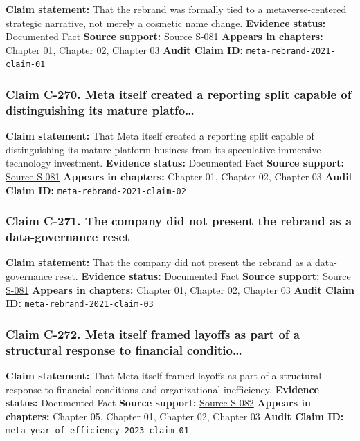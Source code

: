 \documentclass[
  american,
  11pt,
  letterpaper,
]{article}
\begin{document}
\textbf{Claim statement:} That the rebrand was formally tied to a
metaverse-centered strategic narrative, not merely a cosmetic name
change. \textbf{Evidence status:} Documented Fact \textbf{Source
support:}
\hyperref[source-s-081-the-facebook-company-is-now-meta]{Source S-081}
\textbf{Appears in chapters:} Chapter 01, Chapter 02, Chapter 03
\textbf{Audit Claim ID:} \texttt{meta-rebrand-2021-claim-01}

\subsubsection{Claim C-270. Meta itself created a reporting split
capable of distinguishing its mature
platfo\ldots{}}\label{claim-c-270-meta-itself-created-a-reporting-split-capable-of-distinguishing-its-mature-platfo}

\textbf{Claim statement:} That Meta itself created a reporting split
capable of distinguishing its mature platform business from its
speculative immersive-technology investment. \textbf{Evidence status:}
Documented Fact \textbf{Source support:}
\hyperref[source-s-081-the-facebook-company-is-now-meta]{Source S-081}
\textbf{Appears in chapters:} Chapter 01, Chapter 02, Chapter 03
\textbf{Audit Claim ID:} \texttt{meta-rebrand-2021-claim-02}

\subsubsection{Claim C-271. The company did not present the rebrand as a
data-governance
reset}\label{claim-c-271-the-company-did-not-present-the-rebrand-as-a-data-governance-reset}

\textbf{Claim statement:} That the company did not present the rebrand
as a data-governance reset. \textbf{Evidence status:} Documented Fact
\textbf{Source support:}
\hyperref[source-s-081-the-facebook-company-is-now-meta]{Source S-081}
\textbf{Appears in chapters:} Chapter 01, Chapter 02, Chapter 03
\textbf{Audit Claim ID:} \texttt{meta-rebrand-2021-claim-03}

\subsubsection{Claim C-272. Meta itself framed layoffs as part of a
structural response to financial
conditio\ldots{}}\label{claim-c-272-meta-itself-framed-layoffs-as-part-of-a-structural-response-to-financial-conditio}

\textbf{Claim statement:} That Meta itself framed layoffs as part of a
structural response to financial conditions and organizational
inefficiency. \textbf{Evidence status:} Documented Fact \textbf{Source
support:}
\hyperref[source-s-082-mark-zuckerberg-s-message-to-meta-employees]{Source
S-082} \textbf{Appears in chapters:} Chapter 05, Chapter 01, Chapter 02,
Chapter 03 \textbf{Audit Claim ID:}
\texttt{meta-year-of-efficiency-2023-claim-01}
\end{document}
